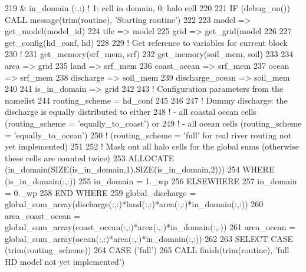 \begin{DoxyCode}
219       & in\_domain       (:,:) \textcolor{comment}{! 1: cell in domain, 0: halo cell }
220 
221     \textcolor{keywordflow}{IF} (debug\_on()) \textcolor{keyword}{CALL }message(trim(routine), \textcolor{stringliteral}{'Starting routine'})
222 
223     model => get\_model(model\_id)
224     tile => model%
225     grid => get\_grid(model%
226 
227     get\_config(hd\_conf, hd)
228 
229     \textcolor{comment}{! Get reference to variables for current block}
230     \textcolor{comment}{!}
231     get\_memory(srf\_mem, srf)
232     get\_memory(soil\_mem, soil)
233 
234     area            => grid     %
235     land            => srf\_mem  %
236     coast\_ocean     => srf\_mem  %
237     ocean           => srf\_mem  %
238     discharge       => soil\_mem %
239     discharge\_ocean => soil\_mem %
240 
241     is\_in\_domain    => grid%
242 
243     \textcolor{comment}{! Configuration parameters from the namelist}
244     routing\_scheme = hd\_conf%
245 
246 
247     \textcolor{comment}{! Dummy discharge: the discharge is equally distributed to either}
248     \textcolor{comment}{!     - all coastal ocean cells (routing\_scheme = 'equally\_to\_coast')  or}
249     \textcolor{comment}{!     - all ocean cells (routing\_scheme = 'equally\_to\_ocean')}
250     \textcolor{comment}{! (routing\_scheme = 'full' for real river routing not yet implemented)}
251 
252     \textcolor{comment}{! Mask out all halo cells for the global sums (otherwise these cells are counted twice)}
253     \textcolor{keyword}{ALLOCATE} (in\_domain(\textcolor{keyword}{SIZE}(is\_in\_domain,1),\textcolor{keyword}{SIZE}(is\_in\_domain,2)))
254     \textcolor{keywordflow}{WHERE} (is\_in\_domain(:,:))
255       in\_domain = 1.\_wp
256     \textcolor{keywordflow}{ELSEWHERE}
257       in\_domain = 0.\_wp
258 \textcolor{keywordflow}{    END WHERE}
259     global\_discharge = global\_sum\_array(discharge(:,:)*land(:,:)*area(:,:)*in\_domain(:,:))
260     area\_coast\_ocean = global\_sum\_array(coast\_ocean(:,:)*area(:,:)*in\_domain(:,:))
261     area\_ocean = global\_sum\_array(ocean(:,:)*area(:,:)*in\_domain(:,:))
262 
263     \textcolor{keywordflow}{SELECT CASE} (trim(routing\_scheme))
264     \textcolor{keywordflow}{CASE} (\textcolor{stringliteral}{'full'})
265       \textcolor{keyword}{CALL }finish(trim(routine), \textcolor{stringliteral}{'full HD model not yet implemented'})

\end{DoxyCode}
